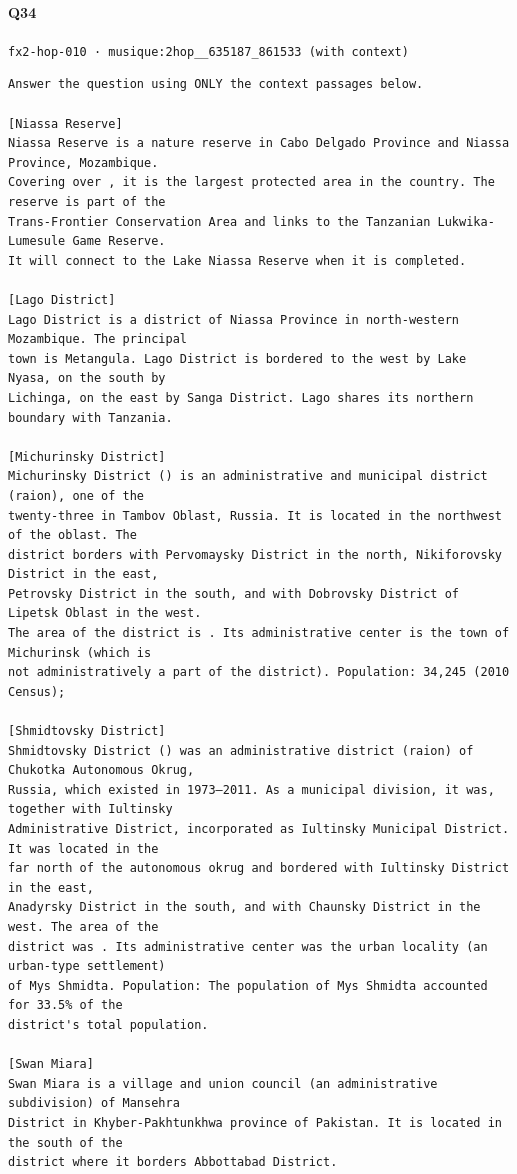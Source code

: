 \documentclass[10pt]{article}
\begin{document}
\paragraph{Q34} \texttt{fx2-hop-010  ·  musique:2hop\_\_635187\_861533 (with context)}
\begin{verbatim}
Answer the question using ONLY the context passages below.

[Niassa Reserve]
Niassa Reserve is a nature reserve in Cabo Delgado Province and Niassa Province, Mozambique.
Covering over , it is the largest protected area in the country. The reserve is part of the
Trans-Frontier Conservation Area and links to the Tanzanian Lukwika-Lumesule Game Reserve.
It will connect to the Lake Niassa Reserve when it is completed.

[Lago District]
Lago District is a district of Niassa Province in north-western Mozambique. The principal
town is Metangula. Lago District is bordered to the west by Lake Nyasa, on the south by
Lichinga, on the east by Sanga District. Lago shares its northern boundary with Tanzania.

[Michurinsky District]
Michurinsky District () is an administrative and municipal district (raion), one of the
twenty-three in Tambov Oblast, Russia. It is located in the northwest of the oblast. The
district borders with Pervomaysky District in the north, Nikiforovsky District in the east,
Petrovsky District in the south, and with Dobrovsky District of Lipetsk Oblast in the west.
The area of the district is . Its administrative center is the town of Michurinsk (which is
not administratively a part of the district). Population: 34,245 (2010 Census);

[Shmidtovsky District]
Shmidtovsky District () was an administrative district (raion) of Chukotka Autonomous Okrug,
Russia, which existed in 1973–2011. As a municipal division, it was, together with Iultinsky
Administrative District, incorporated as Iultinsky Municipal District. It was located in the
far north of the autonomous okrug and bordered with Iultinsky District in the east,
Anadyrsky District in the south, and with Chaunsky District in the west. The area of the
district was . Its administrative center was the urban locality (an urban-type settlement)
of Mys Shmidta. Population: The population of Mys Shmidta accounted for 33.5% of the
district's total population.

[Swan Miara]
Swan Miara is a village and union council (an administrative subdivision) of Mansehra
District in Khyber-Pakhtunkhwa province of Pakistan. It is located in the south of the
district where it borders Abbottabad District.


\end{verbatim}
\end{document}
